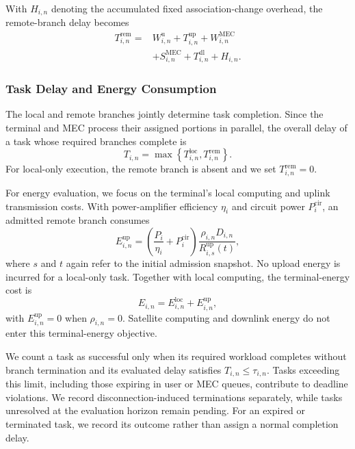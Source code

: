 \documentclass[journal]{IEEEtran}
\begin{document}
With $H_{i,n}$ denoting the accumulated fixed
association-change overhead, the remote-branch delay
becomes
\begin{equation}
\begin{aligned}
T^{\mathrm{rem}}_{i,n}
={}&W^{\mathrm u}_{i,n}
+T^{\mathrm{up}}_{i,n}
+W^{\mathrm{MEC}}_{i,n}\\
&+S^{\mathrm{MEC}}_{i,n}
+T^{\mathrm{dl}}_{i,n}
+H_{i,n}.
\end{aligned}
\label{eq:remote_delay}
\end{equation}

\subsubsection{Task Delay and Energy Consumption}

The local and remote branches jointly determine
task completion. Since the terminal and MEC process
their assigned portions in parallel, the overall
delay of a task whose required branches complete is
\begin{equation}
T_{i,n}=
\max\left\{
T^{\mathrm{loc}}_{i,n},
T^{\mathrm{rem}}_{i,n}
\right\}.
\label{eq:task_delay}
\end{equation}
For local-only execution, the remote branch is absent
and we set $T^{\mathrm{rem}}_{i,n}=0$.

For energy evaluation, we focus on the terminal's
local computing and uplink transmission costs.
With power-amplifier efficiency $\eta_i$ and circuit
power $P_i^{\mathrm{cir}}$, an admitted remote branch
consumes
\begin{equation}
E^{\mathrm{up}}_{i,n}=
\left(\frac{P_i}{\eta_i}+P_i^{\mathrm{cir}}\right)
\frac{\rho_{i,n}D_{i,n}}
{R^{\mathrm{up}}_{i,s}(t)},
\label{eq:upload_energy}
\end{equation}
where $s$ and $t$ again refer to the initial admission
snapshot. No upload energy is incurred for a local-only
task. Together with local computing, the terminal-energy
cost is
\begin{equation}
E_{i,n}=E^{\mathrm{loc}}_{i,n}+E^{\mathrm{up}}_{i,n},
\label{eq:task_energy}
\end{equation}
with $E^{\mathrm{up}}_{i,n}=0$ when $\rho_{i,n}=0$.
Satellite computing and downlink energy do not enter
this terminal-energy objective.

We count a task as successful only when its required
workload completes without branch termination and its
evaluated delay satisfies $T_{i,n}\leq\tau_{i,n}$.
Tasks exceeding this limit, including those expiring
in user or MEC queues, contribute to deadline violations.
We record disconnection-induced terminations separately,
while tasks unresolved at the evaluation horizon remain
pending. For an expired or terminated task, we record
its outcome rather than assign a normal completion delay.
\end{document}
